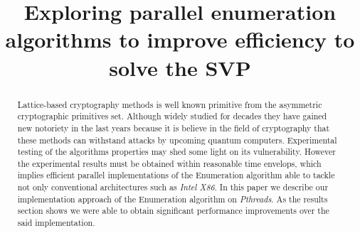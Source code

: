\documentclass[conference]{IEEEtran}
\begin{document}
%
\title{Exploring parallel enumeration algorithms to improve efficiency to solve the SVP}


\author{
\and
{}
\and
{}
}

\maketitle

\begin{abstract}

    Lattice-based cryptography methods is well known primitive from the asymmetric cryptographic primitives set. Although widely studied for decades they have gained new notoriety in the last years because it is believe in the field of cryptography that these methods can withstand attacks by upcoming quantum computers.
    Experimental testing of the algorithms properties may shed some light on its vulnerability. However the experimental results must be obtained  within reasonable time envelops, which implies efficient parallel implementations of the Enumeration algorithm able to tackle not only conventional architectures such as \emph{Intel X86}.
    In this paper we describe our implementation approach of the Enumeration algorithm on \emph{Pthreads}. As the results section shows we were able to obtain significant performance improvements over the said implementation.
    
\end{abstract}
\end{document}
